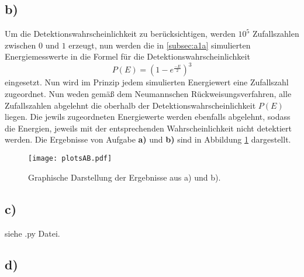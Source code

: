 \subsection{b)}
\label{subsec:a1b}
Um die Detektionswahrscheinlichkeit zu berücksichtigen, werden $10^{5}$ Zufallszahlen zwischen $0$ und $1$ erzeugt, nun werden die in
\ref{subsec:a1a} simulierten Energiemesswerte in die Formel für die Detektionswahrscheinlichkeit
\\
\begin{equation}
  \label{eqn:detect}
  P(E) = \left( 1 - e^{\frac{-E}{2}} \right)^{3}
\end{equation}
eingesetzt.
Nun wird im Prinzip jedem simulierten Energiewert eine Zufallszahl zugeordnet. Nun weden gemäß dem Neumannschen Rückweisungsverfahren,
alle Zufallszahlen abgelehnt die oberhalb der Detektionswahrscheinlichkeit $P(E)$ liegen. Die jewils zugeordneten Energiewerte werden ebenfalls
abgelehnt, sodass die Energien, jeweils mit der entsprechenden Wahrscheinlichkeit nicht detektiert werden.
Die Ergebnisse von Aufgabe \textbf{a)} und \textbf{b)} sind in Abbildung \ref{fig:plotAB} dargestellt.

\FloatBarrier
\begin{figure}
  \centering
  \texttt{[image: plotsAB.pdf]}
  \caption{Graphische Darstellung der Ergebnisse aus a) und b).}
  \label{fig:plotAB}
\end{figure}
\FloatBarrier


\subsection{c)}
\label{subsec:a1c}
siehe .py Datei.



\subsection{d)}
\label{subsec:a1d}
